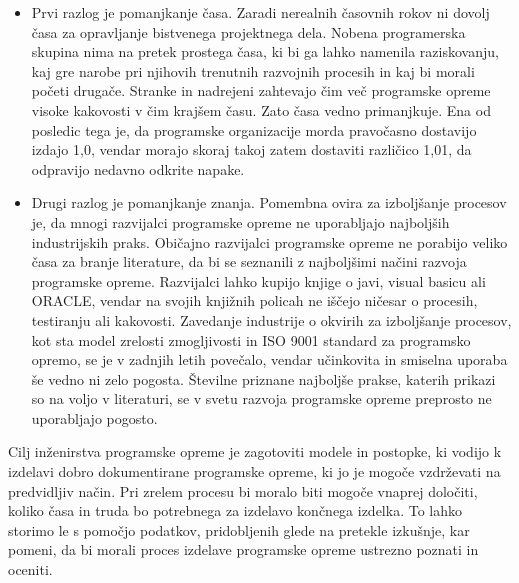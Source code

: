 \documentclass[a4paper,12pt,openright]{book}
\begin{document}
\begin{itemize}
    \item Prvi razlog je pomanjkanje časa. Zaradi nerealnih časovnih rokov ni dovolj časa za opravljanje bistvenega projektnega dela. Nobena programerska skupina nima na pretek prostega časa, ki bi ga lahko namenila raziskovanju, kaj gre narobe pri njihovih trenutnih razvojnih procesih in kaj bi morali početi drugače. Stranke in nadrejeni zahtevajo čim več programske opreme visoke kakovosti v čim krajšem času. Zato časa vedno primanjkuje. Ena od posledic tega je, da programske organizacije morda pravočasno dostavijo izdajo 1,0, vendar morajo skoraj takoj zatem dostaviti različico 1,01, da odpravijo nedavno odkrite napake.
    \item Drugi razlog je pomanjkanje znanja. Pomembna ovira za izboljšanje procesov je, da mnogi razvijalci programske opreme ne uporabljajo najboljših industrijskih praks. Običajno razvijalci programske opreme ne porabijo veliko časa za branje literature, da bi se seznanili z najboljšimi načini razvoja programske opreme. Razvijalci lahko kupijo knjige o javi, visual basicu ali ORACLE, vendar na svojih knjižnih policah ne iščejo ničesar o procesih, testiranju ali kakovosti.
Zavedanje industrije o okvirih za izboljšanje procesov, kot sta model zrelosti zmogljivosti in ISO 9001 standard za programsko opremo, se je v zadnjih letih povečalo, vendar učinkovita in smiselna uporaba še vedno ni zelo pogosta. Številne priznane najboljše prakse, katerih prikazi so na voljo v literaturi, se v svetu razvoja programske opreme preprosto ne uporabljajo pogosto. \cite{aggarwal2005software}
\end{itemize}
Cilj inženirstva programske opreme je zagotoviti modele in postopke, ki vodijo k izdelavi dobro dokumentirane programske opreme, ki jo je mogoče vzdrževati na predvidljiv način. Pri zrelem procesu bi moralo biti mogoče vnaprej določiti, koliko časa in truda bo potrebnega za izdelavo končnega izdelka. To lahko storimo le s pomočjo podatkov, pridobljenih glede na pretekle izkušnje, kar pomeni, da bi morali proces izdelave programske opreme ustrezno poznati in oceniti. 
\end{document}
